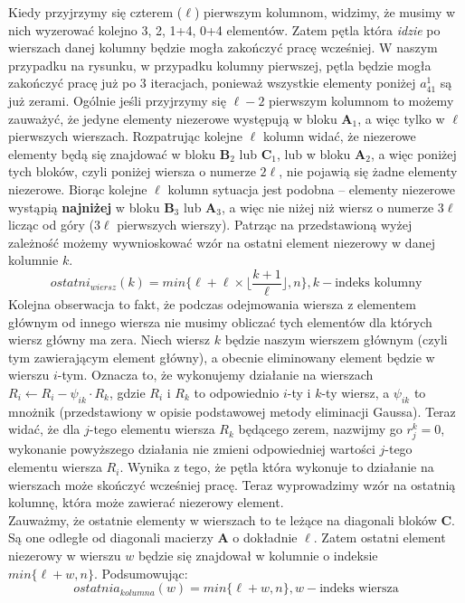 \documentclass[]{article}
\newcommand{\mA}{\bm{A}}
\newcommand{\mB}{\bm{B}}
\newcommand{\mC}{\bm{C}}
\begin{document}
	Kiedy przyjrzymy się czterem ($\ell$) pierwszym kolumnom, widzimy, że musimy w nich wyzerować kolejno 3, 2, 1+4, 0+4 elementów. Zatem pętla która \textit{idzie} po wierszach danej kolumny będzie mogła zakończyć pracę wcześniej. W naszym przypadku na rysunku, w przypadku kolumny pierwszej, pętla będzie mogła zakończyć pracę już po 3 iteracjach, ponieważ wszystkie elementy poniżej $a^1_{41}$ są już zerami.
	Ogólnie jeśli przyjrzymy się $\ell -2$ pierwszym kolumnom to możemy zauważyć, że jedyne elementy niezerowe występują w bloku $\mA_1$, a więc tylko w $\ell$ pierwszych wierszach. Rozpatrując kolejne $\ell$ kolumn widać, że niezerowe elementy będą się znajdować w bloku $\mB_2$ lub $\mC_1$, lub w bloku $\mA_2$, a więc poniżej tych bloków, czyli poniżej wiersza o numerze $2\ell$, nie pojawią się żadne elementy niezerowe. Biorąc kolejne $\ell$ kolumn sytuacja jest podobna -- elementy niezerowe wystąpią \textbf{najniżej} w bloku $\mB_3$ lub $\mA_3$, a więc nie niżej niż wiersz o numerze $3\ell$ licząc od góry ($3\ell$ pierwszych wierszy). Patrząc na przedstawioną wyżej zależność możemy wywnioskować wzór na ostatni element niezerowy w danej kolumnie $k$. 
	$$ ostatni_{wiersz}(k) = min\lbrace \ell + \ell \times \lfloor \frac{k+1}{\ell}\rfloor , n \rbrace, k - \text{indeks kolumny} $$
	Kolejna obserwacja to fakt, że podczas odejmowania wiersza z elementem głównym od innego wiersza nie musimy obliczać tych elementów dla których wiersz główny ma zera. Niech wiersz $k$ będzie naszym wierszem głównym (czyli tym zawierającym element główny), a obecnie eliminowany element będzie w wierszu $i$-tym. Oznacza to, że wykonujemy działanie na wierszach $ R_i \leftarrow R_i -\psi_{ik} \cdot R_k$, gdzie $R_i$ i $R_k$ to odpowiednio $i$-ty i $k$-ty wiersz, a $\psi_{ik}$ to mnożnik (przedstawiony w opisie podstawowej metody eliminacji Gaussa). Teraz widać, że dla $j$-tego elementu wiersza $R_k$ będącego zerem, nazwijmy go $r^k_j = 0$, wykonanie powyższego działania nie zmieni odpowiedniej wartości $j$-tego elementu wiersza $R_i$. Wynika z tego, że pętla która wykonuje to działanie na wierszach może skończyć wcześniej pracę. Teraz wyprowadzimy wzór na ostatnią kolumnę, która może zawierać niezerowy element.\\
	Zauważmy, że ostatnie elementy w wierszach to te leżące na diagonali bloków $\mC$. Są one odległe od diagonali macierzy $\mA$ o dokładnie $\ell$. Zatem ostatni element niezerowy w wierszu $w$ będzie się znajdował w kolumnie o indeksie $min\lbrace \ell + w , n \rbrace $. Podsumowując:
	$$ ostatnia_{kolumna}(w) = min\lbrace \ell + w , n \rbrace, w - \text{indeks wiersza} $$
\end{document}
